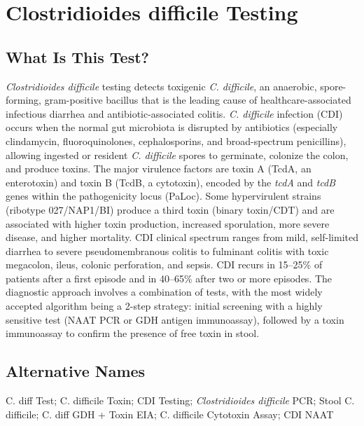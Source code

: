 \chapter{Clostridioides difficile Testing}

\section*{What Is This Test?}
\textit{Clostridioides difficile} testing detects toxigenic \textit{C. difficile}, an anaerobic, spore-forming, gram-positive bacillus that is the leading cause of healthcare-associated infectious diarrhea and antibiotic-associated colitis. \textit{C. difficile} infection (CDI) occurs when the normal gut microbiota is disrupted by antibiotics (especially clindamycin, fluoroquinolones, cephalosporins, and broad-spectrum penicillins), allowing ingested or resident \textit{C. difficile} spores to germinate, colonize the colon, and produce toxins. The major virulence factors are toxin A (TcdA, an enterotoxin) and toxin B (TcdB, a cytotoxin), encoded by the \textit{tcdA} and \textit{tcdB} genes within the pathogenicity locus (PaLoc). Some hypervirulent strains (ribotype 027/NAP1/BI) produce a third toxin (binary toxin/CDT) and are associated with higher toxin production, increased sporulation, more severe disease, and higher mortality. CDI clinical spectrum ranges from mild, self-limited diarrhea to severe pseudomembranous colitis to fulminant colitis with toxic megacolon, ileus, colonic perforation, and sepsis. CDI recurs in 15--25\% of patients after a first episode and in 40--65\% after two or more episodes. The diagnostic approach involves a combination of tests, with the most widely accepted algorithm being a 2-step strategy: initial screening with a highly sensitive test (NAAT PCR or GDH antigen immunoassay), followed by a toxin immunoassay to confirm the presence of free toxin in stool.

\section*{Alternative Names}
C. diff Test; C. difficile Toxin; CDI Testing; \textit{Clostridioides difficile} PCR; Stool C. difficile; C. diff GDH + Toxin EIA; C. difficile Cytotoxin Assay; CDI NAAT

